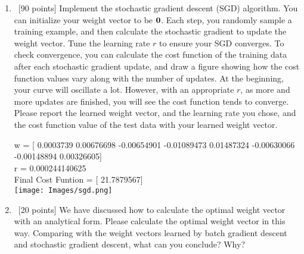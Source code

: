 \documentclass[12pt, fullpage,letterpaper]{article}
\begin{document}
\begin{enumerate}
\begin{enumerate}
\item~[90 points] Implement the stochastic gradient descent (SGD) algorithm. You can initialize your weight vector to be ${\bf 0}$. Each step, you randomly sample a training example, and then calculate the stochastic gradient to update the weight vector.  Tune the learning rate $r$ to ensure your SGD converges. To check convergence, you can calculate the cost function of the training data after each stochastic gradient update, and draw a figure showing how the cost function values vary along with the number of updates. At the beginning, your curve will oscillate a lot. However, with an appropriate $r$, as more and more updates are finished, you will see the cost function tends to converge. Please report the learned weight vector, and the learning rate you chose, and the cost function value of the test data with your learned weight vector.

w = [ 0.0003739   0.00676698 -0.00654901 -0.01089473  0.01487324 -0.00630066 -0.00148894  0.00326605]\\

r = 0.000244140625\\
Final Cost Funtion = [ 21.7879567]\\

\texttt{[image: Images/sgd.png]}


\item~[20 points] We have discussed how to  calculate the optimal weight vector with an analytical form. Please calculate the optimal weight vector in this way. Comparing with the  weight vectors learned by batch gradient descent and stochastic gradient descent, what can you conclude? Why?
\end{enumerate}




\end{enumerate}
\end{document}
